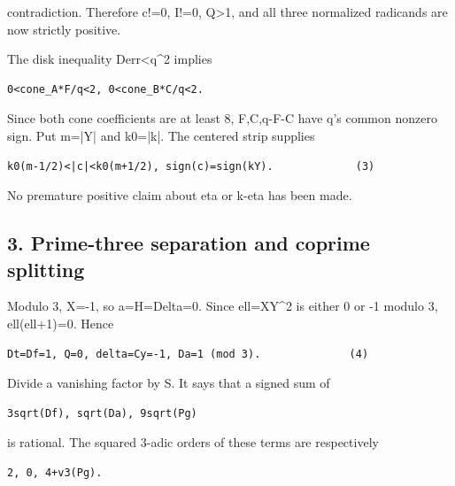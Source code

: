 contradiction. Therefore c!=\allowbreak{}0, I!=\allowbreak{}0, Q\textgreater{}\allowbreak{}1, and all three normalized radicands are now strictly positive.



The disk inequality Derr\textless{}\allowbreak{}q\textasciicircum{}\allowbreak{}2 implies



\begin{verbatim}
0<cone_A*F/q<2, 0<cone_B*C/q<2.
\end{verbatim}

Since both cone coefficients are at least 8, F,C,q-F-C have q's common nonzero sign. Put m=\allowbreak{}|Y| and k0=\allowbreak{}|k|. The centered strip supplies



\begin{verbatim}
k0(m-1/2)<|c|<k0(m+1/2), sign(c)=sign(kY).             (3)
\end{verbatim}

No premature positive claim about eta or k-eta has been made.



\subsection*{3. Prime-three separation and coprime splitting}



Modulo 3, X=\allowbreak{}-1, so a=\allowbreak{}H=\allowbreak{}Delta=\allowbreak{}0. Since ell=\allowbreak{}XY\textasciicircum{}\allowbreak{}2 is either 0 or -1 modulo 3, ell(ell+\allowbreak{}1)=\allowbreak{}0. Hence



\begin{verbatim}
Dt=Df=1, Q=0, delta=Cy=-1, Da=1 (mod 3).              (4)
\end{verbatim}

Divide a vanishing factor by S. It says that a signed sum of



\begin{verbatim}
3sqrt(Df), sqrt(Da), 9sqrt(Pg)
\end{verbatim}

is rational. The squared 3-adic orders of these terms are respectively



\begin{verbatim}
2, 0, 4+v3(Pg).
\end{verbatim}

